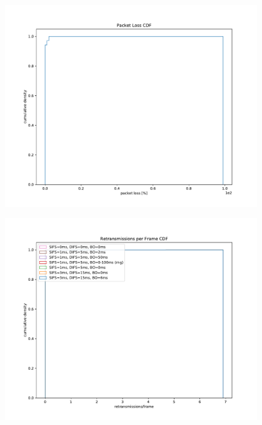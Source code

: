 \documentclass{article}
\begin{document}
\begin{figure}
	\includegraphics[width=\textwidth]{cdf/packet_loss_cdf}
\end{figure}

\begin{figure}
	\includegraphics[width=\textwidth]{cdf/retransmissions_per_frame_cdf}
\end{figure}
\end{document}
